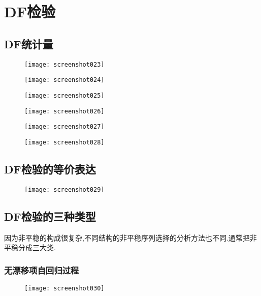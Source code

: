 \documentclass[11pt,a4paper,oneside]{book}
\begin{document}
\section{DF检验}
\subsection{DF统计量}
\begin{figure}[H]
	\texttt{[image: screenshot023]}
	\label{fig:screenshot023}
\end{figure}
\begin{figure}[H]
	\texttt{[image: screenshot024]}
	\label{fig:screenshot024}
\end{figure}
\begin{figure}[H]
	\texttt{[image: screenshot025]}
	\label{fig:screenshot025}
\end{figure}
\begin{figure}[H]
	\texttt{[image: screenshot026]}
	\label{fig:screenshot026}
\end{figure}
\begin{figure}[H]
	\texttt{[image: screenshot027]}
	\label{fig:screenshot027}
\end{figure}
\begin{figure}[H]
	\texttt{[image: screenshot028]}
	\label{fig:screenshot028}
\end{figure}
\subsection{DF检验的等价表达}
\begin{figure}[H]
	\texttt{[image: screenshot029]}
	\label{fig:screenshot029}
\end{figure}
\subsection{DF检验的三种类型}
因为非平稳的构成很复杂,不同结构的非平稳序列选择的分析方法也不同.通常把非平稳分成三大类.
\subsubsection{无漂移项自回归过程}
\begin{figure}[H]
	\texttt{[image: screenshot030]}
	\label{fig:screenshot030}
\end{figure}
\end{document}
